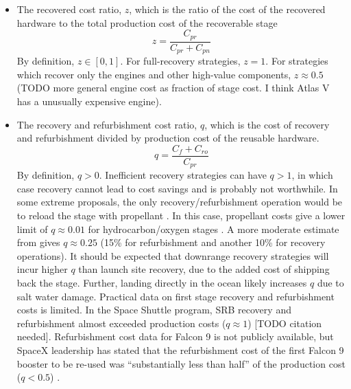 \documentclass[conf]{new-aiaa}
\begin{document}
\begin{itemize}
	\item The recovered cost ratio, $z$, which is the ratio of the cost of the recovered hardware to the total production cost of the recoverable stage
    \begin{equation}
    z = \frac{C_{pr}}{C_{pr} + C_{pn}}
    \end{equation}
    By definition, $z \in [0, 1]$. For full-recovery strategies, $z=1$. For strategies which recover only the engines and other high-value components, $z \approx 0.5$ \cite{Ragab2015} (TODO more general engine cost as fraction of stage cost. I think Atlas V has a unusually expensive engine).
    
    \item The recovery and refurbishment cost ratio, $q$, which is the cost of recovery and refurbishment divided by production cost of the reusable hardware.
    \begin{equation}
    q = \frac{C_{f} + C_{ro}}{C_{pr}}
    \end{equation}
    By definition, $q > 0$. Inefficient recovery strategies can have $q > 1$, in which case recovery cannot lead to cost savings and is probably not worthwhile. In some extreme proposals, the only recovery/refurbishment operation would be to reload the stage with propellant \cite{Musk2017}. In this case, propellant costs give a lower limit of $q \approx 0.01$ for hydrocarbon/oxygen stages \cite{Ragab2015}. A more moderate estimate from \cite{Sforza2015} gives $q \approx 0.25$ (15\% for refurbishment and another 10\% for recovery operations). It should be expected that downrange recovery strategies will incur higher $q$ than launch site recovery, due to the added cost of shipping back the stage. Further, landing directly in the ocean likely increases $q$ due to salt water damage. Practical data on first stage recovery and refurbishment costs is limited. In the Space Shuttle program, SRB recovery and refurbishment almost exceeded production costs ($q \approx 1$) [TODO citation needed]. Refurbishment cost data for Falcon 9 is not publicly available, but SpaceX leadership has stated that the refurbishment cost of the first Falcon 9 booster to be re-used was ``substantially less than half'' of the production cost ($q<0.5$) \cite{Foust2017}.
   

\end{itemize}
\end{document}
